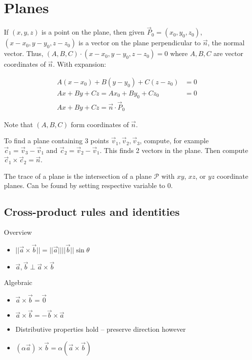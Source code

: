 \section{Planes}

If $(x,y,z)$ is a point on the plane, then given $\vec{P}_0=(x_0,y_0,z_0)$, $(x-x_0,y-y_0,z-z_0)$ is a vector on the plane perpendicular to $\vec{n}$, the
normal vector. Thus, $(A,B,C)\cdot(x-x_0,y-y_0,z-z_0)=0$ where $A,B,C$ are vector coordinates of $\vec{n}$. With expansion:

\begin{align*}
    A(x-x_0)+B(y-y_0)+C(z-z_0)&=0\\
    Ax+By+Cz=Ax_0+By_0+Cz_0&=0\\
    Ax+By+Cz=\vec{n}\cdot \vec{P}_0
\end{align*}

Note that $(A,B,C)$ form coordinates of $\vec{n}$.

To find a plane containing 3 points $\vec{v}_1,\vec{v}_2,\vec{v}_3$, compute, for example $\vec{c}_1=\vec{v}_3-\vec{v}_1$ and $\vec{c}_2=\vec{v}_2-\vec{v}_1$.
This finds 2 vectors in the plane. Then compute $\vec{c}_1\times \vec{c}_2=\vec{n}$. \newline

\noindent
The trace of a plane is the intersection of a plane $\mathcal{P}$ with $xy$, $xz$, or $yz$ coordinate planes. Can be found by setting respective variable to 0.
\subsection{Cross-product rules and identities}

Overview
\begin{itemize}
    \item $||\vec{a}\times \vec{b}||=||\vec{a}||||\vec{b}||\sin\theta$
    \item $\vec{a},\vec{b}\perp \vec{a}\times \vec{b}$
\end{itemize}

Algebraic
\begin{itemize}
    \item $\vec{a}\times \vec{b}=\vec{0}$
    \item $\vec{a}\times \vec{b}=-\vec{b}\times \vec{a}$
    \item Distributive properties hold -- preserve direction however
    \item $(\alpha \vec{a})\times \vec{b}=\alpha(\vec{a}\times \vec{b})$
\end{itemize}

